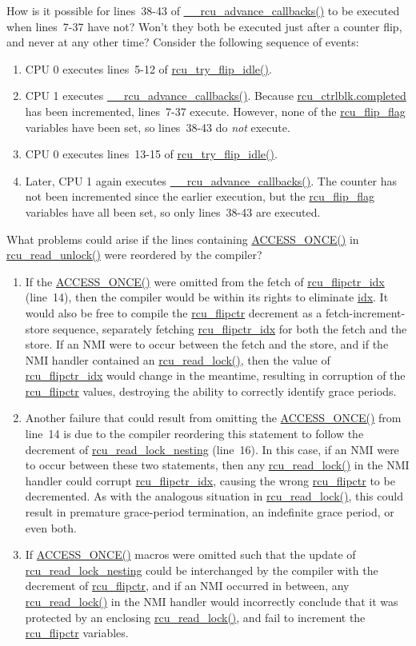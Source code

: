 \QuickQ{}
	How is it possible for lines~38-43 of
	\url{__rcu_advance_callbacks()} to be executed when
	lines~7-37 have not?
	Won't they both be executed just after a counter flip, and
	never at any other time?
\QuickA{}
	Consider the following sequence of events:
	\begin{enumerate}
	\item	CPU 0 executes lines~5-12 of
		\url{rcu_try_flip_idle()}.
	\item	CPU 1 executes \url{__rcu_advance_callbacks()}.
		Because \url{rcu_ctrlblk.completed} has been
		incremented, lines~7-37 execute.
		However, none of the \url{rcu_flip_flag} variables
		have been set, so lines~38-43 do \emph{not} execute.
	\item	CPU 0 executes lines~13-15 of
		\url{rcu_try_flip_idle()}.
	\item	Later, CPU 1 again executes \url{__rcu_advance_callbacks()}.
		The counter has not been incremented since the earlier
		execution, but the \url{rcu_flip_flag} variables have
		all been set, so only lines~38-43 are executed.
	\end{enumerate}

\QuickQ{}
	What problems could arise if the lines containing
	\url{ACCESS_ONCE()} in \url{rcu_read_unlock()}
	were reordered by the compiler?
\QuickA{}
	\begin{enumerate}
	\item	If the \url{ACCESS_ONCE()} were omitted from the
		fetch of \url{rcu_flipctr_idx} (line~14), then the compiler
		would be within its rights to eliminate \url{idx}.
		It would also be free to compile the \url{rcu_flipctr}
		decrement as a fetch-increment-store sequence, separately
		fetching \url{rcu_flipctr_idx} for both the fetch and
		the store.
		If an NMI were to occur between the fetch and the store, and
		if the NMI handler contained an \url{rcu_read_lock()},
		then the value of \url{rcu_flipctr_idx} would change
		in the meantime, resulting in corruption of the
		\url{rcu_flipctr} values, destroying the ability
		to correctly identify grace periods.
	\item	Another failure that could result from omitting the
		\url{ACCESS_ONCE()} from line~14 is due to
		the compiler reordering this statement to follow the
		decrement of \url{rcu_read_lock_nesting}
		(line~16).
		In this case, if an NMI were to occur between these two
		statements, then any \url{rcu_read_lock()} in the
		NMI handler could corrupt \url{rcu_flipctr_idx},
		causing the wrong \url{rcu_flipctr} to be
		decremented.
		As with the analogous situation in \url{rcu_read_lock()},
		this could result in premature grace-period termination,
		an indefinite grace period, or even both.
	\item	If \url{ACCESS_ONCE()} macros were omitted such that
		the update of \url{rcu_read_lock_nesting} could be
		interchanged by the compiler with the decrement of
		\url{rcu_flipctr}, and if an NMI occurred in between,
		any \url{rcu_read_lock()} in the NMI handler would
		incorrectly conclude that it was protected by an enclosing
		\url{rcu_read_lock()}, and fail to increment the
		\url{rcu_flipctr} variables.
	\end{enumerate}

